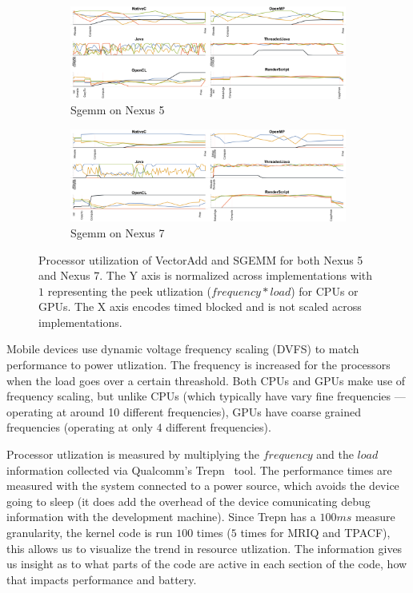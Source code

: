 \begin{figure}[ht]
  \begin{subfigure}[b]{0.9\textwidth}
       \centering
       \includegraphics[width=\textwidth]{data/load_sgemm_nexus5.pdf}
       \caption{Sgemm on Nexus 5}\label{fig:Sgemm5}
   \end{subfigure}
  \begin{subfigure}[b]{0.9\textwidth}
       \centering
       \includegraphics[width=\textwidth]{data/load_sgemm_nexus7.pdf}
       \caption{Sgemm on Nexus 7}\label{fig:Sgemm7}
   \end{subfigure}


  \caption{Processor utilization of VectorAdd and SGEMM for both Nexus 5 and Nexus 7. The Y axis is normalized across implementations with $1$ representing the peek utlization ($frequency*load$) for CPUs or GPUs. The X axis encodes timed blocked and is not scaled across implementations.}
  \label{fig:loadVecAddSgemm}
\end{figure}
\FloatBarrier

Mobile devices use dynamic voltage frequency scaling (DVFS)
  to match performance to power utlization.
The frequency is increased for the processors when the load goes over a certain
  threashold.
Both CPUs and GPUs make use of frequency scaling, but unlike CPUs (which typically
  have vary fine frequencies --- operating at around 10 different frequencies), GPUs
  have coarse grained frequencies (operating at only 4 different frequencies).  

Processor utlization is measured by multiplying the $frequency$ and the $load$ information collected via Qualcomm's Trepn~\cite{profilerqualcomm} tool.
The performance times are measured with the system connected to a
  power source, which avoids the device going to sleep (it does add the
  overhead of the device comunicating debug information with the development
  machine).
Since Trepn has a $100ms$ measure granularity, the kernel code is run $100$ times
  ($5$ times for MRIQ and TPACF), this allows us to visualize the trend in resource
  utlization.
The information gives us insight as to what parts of the code are active in each
	section of the code, how that impacts performance and battery.



